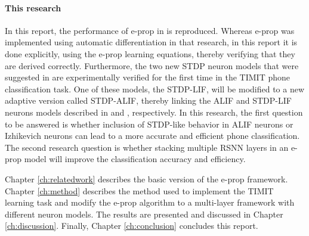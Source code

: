 \paragraph{This research}
In this report, the performance of e-prop in \citet{bellec2020solution} is reproduced.
Whereas e-prop was implemented using automatic differentiation in that research, in this report it is done explicitly, using the e-prop learning equations, thereby verifying that they are derived correctly.
Furthermore, the two new STDP neuron models that were suggested in \citet{traub2020learning} are experimentally verified for the first time in the TIMIT phone classification task.
One of these models, the STDP-LIF, will be modified to a new adaptive version called STDP-ALIF, thereby linking the ALIF and STDP-LIF neurons models described in \citet{bellec2020solution} and \citet{traub2020learning}, respectively.
In this research, the first question to be answered is whether inclusion of STDP-like behavior in ALIF neurons or Izhikevich neurons can lead to a more accurate and efficient phone classification.
The second research question is whether stacking multiple RSNN layers in an e-prop model will improve the classification accuracy and efficiency.

Chapter \ref{ch:relatedwork} describes the basic version of the e-prop framework.
Chapter \ref{ch:method} describes the method used to implement the TIMIT learning task and modify the e-prop algorithm to a multi-layer framework with different neuron models.
The results are presented and discussed in Chapter \ref{ch:discussion}.
Finally, Chapter \ref{ch:conclusion} concludes this report.
